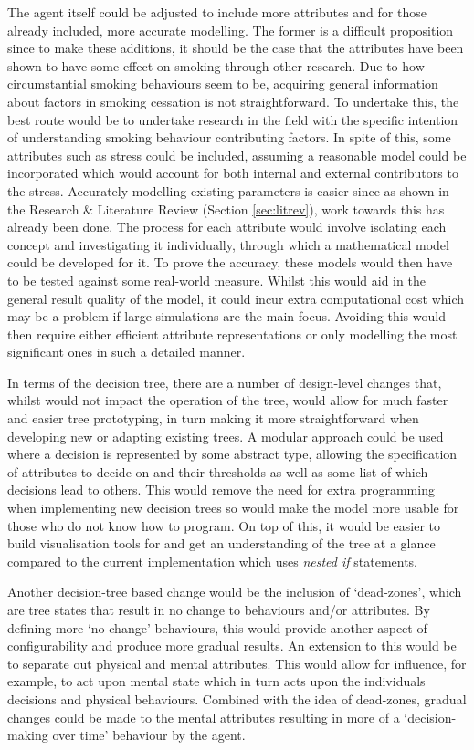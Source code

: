 \documentclass[]{report}
\begin{document}
The agent itself could be adjusted to include more attributes and for those already included, more accurate modelling. The former is a difficult proposition since to make these additions, it should be the case that the attributes have been shown to have some effect on smoking through other research. Due to how circumstantial smoking behaviours seem to be, acquiring general information about factors in smoking cessation is not straightforward. To undertake this, the best route would be to undertake research in the field with the specific intention of understanding smoking behaviour contributing factors. In spite of this, some attributes such as stress could be included, assuming a reasonable model could be incorporated which would account for both internal and external contributors to the stress. Accurately modelling existing parameters is easier since as shown in the Research \& Literature Review (Section \ref{sec:litrev}), work towards this has already been done. The process for each attribute would involve isolating each concept and investigating it individually, through which a mathematical model could be developed for it. To prove the accuracy, these models would then have to be tested against some real-world measure. Whilst this would aid in the general result quality of the model, it could incur extra computational cost which may be a problem if large simulations are the main focus. Avoiding this would then require either efficient attribute representations or only modelling the most significant ones in such a detailed manner.

In terms of the decision tree, there are a number of design-level changes that, whilst would not impact the operation of the tree, would allow for much faster and easier tree prototyping, in turn making it more straightforward when developing new or adapting existing trees. A modular approach could be used where a decision is represented by some abstract type, allowing the specification of attributes to decide on and their thresholds as well as some list of which decisions lead to others. This would remove the need for extra programming when implementing new decision trees so would make the model more usable for those who do not know how to program. On top of this, it would be easier to build visualisation tools for and get an understanding of the tree at a glance compared to the current implementation which uses \emph{nested if} statements.

Another decision-tree based change would be the inclusion of `dead-zones', which are tree states that result in no change to behaviours and/or attributes. By defining more `no change' behaviours, this would provide another aspect of configurability and  produce more gradual results. An extension to this would be to separate out physical and mental attributes. This would allow for influence, for example, to act upon mental state which in turn acts upon the individuals decisions and physical behaviours. Combined with the idea of dead-zones, gradual changes could be made to the mental attributes resulting in more of a `decision-making over time' behaviour by the agent.
\end{document}
